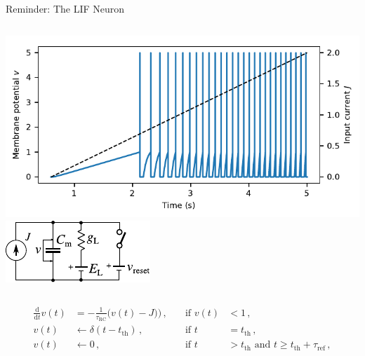 \documentclass[handout,aspectratio=169]{beamer}
\begin{document}
\begin{frame}{Reminder: The LIF Neuron}
	\begin{columns}[c]
		\includegraphics[width=\textwidth]{media/lif_neuron_ramp.pdf}
		\includegraphics[width=\textwidth]{media/lif_circuit.pdf}
	\end{columns}
	\begin{align*}
		\frac{\mathrm{d}}{\mathrm{d}t} v(t) &= -\frac{1}{\tau_\mathrm{RC}} \big( v(t) - J \big) \big) \,, \quad &\text{if } v(t) &< 1\,, \\
		v(t) &\gets \delta(t - t_\mathrm{th}) \,, &\text{if } t &= t_\mathrm{th} \,,\\
		v(t) &\gets 0 \,, &\text{if } t &> t_\mathrm{th} \text{ and } t \geq t_\mathrm{th} + \tau_\mathrm{ref} \,,
	\end{align*}
\end{frame}
\end{document}
